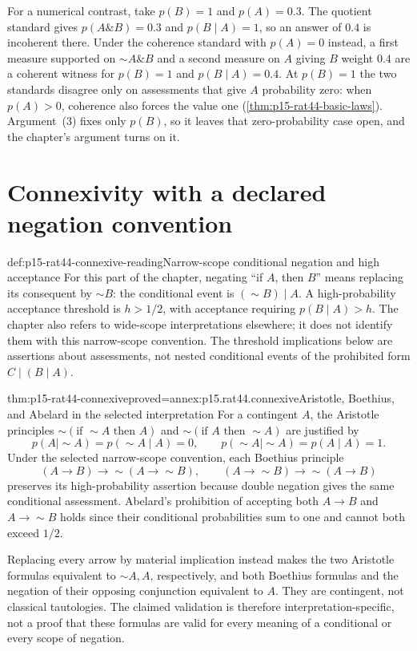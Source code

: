 For a numerical contrast, take \(p(B)=1\) and \(p(A)=0.3\). The
quotient standard gives \(p(A\mathbin{\&}B)=0.3\) and
\(p(B\mid A)=1\), so an answer of \(0.4\) is incoherent there. Under
the coherence standard with \(p(A)=0\) instead, a first measure
supported on \(\sim A\mathbin{\&}B\) and a second measure on \(A\)
giving \(B\) weight \(0.4\) are a coherent witness for \(p(B)=1\) and
\(p(B\mid A)=0.4\). At \(p(B)=1\) the two standards disagree only on
assessments that give \(A\) probability zero: when \(p(A)>0\), coherence
also forces the value one (\cref{thm:p15-rat44-basic-laws}). Argument~(3)
fixes only \(p(B)\), so it leaves that zero-probability case open, and
the chapter's argument turns on it.

\section{Connexivity with a declared negation convention}

\begin{hbdefinition}{def:p15-rat44-connexive-reading}{Narrow-scope conditional negation and high acceptance}
For this part of the chapter, negating ``if \(A\), then \(B\)''
means replacing its consequent by \(\sim B\): the conditional event
is \((\sim B)\mid A\). A high-probability acceptance threshold is
\(h>1/2\), with acceptance requiring \(p(B\mid A)>h\).
The chapter also refers to wide-scope interpretations elsewhere; it
does not identify them with this narrow-scope convention.
The threshold implications below are assertions about assessments,
not nested conditional events of the prohibited form
\(C\mid(B\mid A)\).
\end{hbdefinition}

\begin{hbtheorem}{thm:p15-rat44-connexive}{proved=annex:p15.rat44.connexive}{Aristotle, Boethius, and Abelard in the selected interpretation}
For a contingent \(A\), the Aristotle principles
\(\sim(\text{if }\sim A\text{ then }A)\) and
\(\sim(\text{if }A\text{ then }\sim A)\) are justified by
\[
 p(A\mid\sim A)=p(\sim A\mid A)=0,\qquad
 p(\sim A\mid\sim A)=p(A\mid A)=1.
\]
Under the selected narrow-scope convention, each Boethius principle
\[
 (A\to B)\to\sim(A\to\sim B),\qquad
 (A\to\sim B)\to\sim(A\to B)
\]
preserves its high-probability assertion because double negation gives
the same conditional assessment. Abelard's prohibition of accepting
both \(A\to B\) and \(A\to\sim B\) holds since their conditional
probabilities sum to one and cannot both exceed \(1/2\).

Replacing every arrow by material implication instead makes the two
Aristotle formulas equivalent to \(\sim A,A\), respectively, and
both Boethius formulas and the negation of their opposing conjunction
equivalent to \(A\). They are contingent, not classical tautologies.
The claimed validation is therefore interpretation-specific, not a
proof that these formulas are valid for every meaning of a conditional
or every scope of negation.
\end{hbtheorem}

